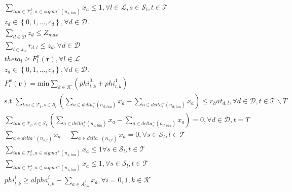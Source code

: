 \begin{align}
  & \sum_{\mathit{tau} \in \mathcal{T}_{t}^{h}, a \in \mathit{sigma}^{-} \left(n_{s , \mathit{tau}}\right)} x_{a} \leq 1 , \forall l \in \mathcal{L} , s \in \mathcal{S}_{l} , t \in \mathcal{T} \tag{eq\_0029} \\
  & z_{d} \in \left\{0 , 1 , \ldots , c_{d}\right\} , \forall d \in \mathcal{D} . \tag{eq\_0034} \\
  & \sum_{d \in \mathcal{D}} z_{d} \leq Z_{m a x} \tag{eq\_0037\_a} \\
  & \sum_{l \in \mathcal{L}_{d}} r_{d , l} \leq z_{d} , \forall d \in \mathcal{D} \tag{eq\_0037\_b} \\
  & \mathit{theta}_{l} \geq F_{l}^{x} \left(\mathbf{r}\right) , \forall l \in \mathcal{L} \tag{eq\_0037\_c} \\
  & z_{d} \in \left\{0 , 1 , \ldots , c_{d}\right\} , \forall d \in \mathcal{D} . \tag{eq\_0037\_d} \\
  & F_{l}^{x} \left(\mathbf{r}\right) = \text{min} \sum_{k \in \mathcal{K}} \left(\mathit{phi}_{l , k}^{0} + \mathit{phi}_{l , k}^{1}\right) \tag{eq\_0038} \\
  & \text{s}.\text{t}. \sum_{\mathit{tau} \in \mathcal{T}_{t}, s \in \mathcal{S}_{l}} \left(\sum_{a \in \mathit{delta}_{s}^{+} \left(n_{d , \mathit{tau}}\right)} x_{a} - \sum_{a \in \mathit{delta}_{s}^{-} \left(n_{d , \mathit{tau}}\right)} x_{a}\right) \leq r_hat_{d , l} , \forall d \in \mathcal{D} , t \in \mathcal{T} \backslash T \tag{eq\_0040} \\
  & \sum_{\mathit{tau} \in \mathcal{T}_{t}, s \in \mathcal{S}_{l}} \left(\sum_{a \in \mathit{delta}_{s}^{+} \left(n_{d , \mathit{tau}}\right)} x_{a} - \sum_{a \in \mathit{delta}_{s}^{-} \left(n_{d , \mathit{tau}}\right)} x_{a}\right) = 0 , \forall d \in \mathcal{D} , t = T \tag{eq\_0041} \\
  & \sum_{a \in \mathit{delta}^{+} \left(n_{s , t}\right)} x_{a} - \sum_{a \in \mathit{delta}^{-} \left(n_{s , t}\right)} x_{a} = 0 , \forall s \in \mathcal{S}_{l} , t \in \mathcal{T} \tag{eq\_0042} \\
  & \sum_{\mathit{tau} \in \mathcal{T}_{t}^{h}, a \in \mathit{sigma}^{+} \left(n_{s , \mathit{tau}}\right)} x_{a} \leq 1 \forall s \in \mathcal{S}_{l} , t \in \mathcal{T} \tag{eq\_0043} \\
  & \sum_{\mathit{tau} \in \mathcal{T}_{t}^{h}, a \in \mathit{sigma}^{-} \left(n_{s , \mathit{tau}}\right)} x_{a} \leq 1 , \forall s \in \mathcal{S}_{l} , t \in \mathcal{T} \tag{eq\_0044} \\
  & \mathit{phi}_{l , k}^{i} \geq \mathit{alpha}_{l , k}^{i} - \sum_{a \in A_{l , k}^{i}} x_{a} , \forall i = 0 , 1 , k \in \mathcal{K} \tag{eq\_0045} \\

\end{align}
